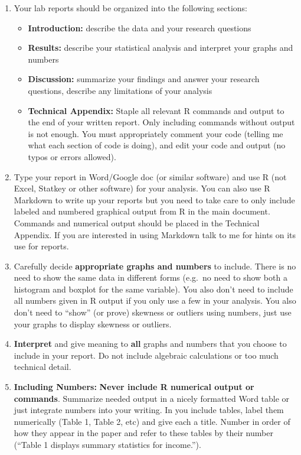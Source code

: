 \documentclass[
]{book}
\providecommand{\tightlist}{%
  \setlength{\itemsep}{0pt}\setlength{\parskip}{0pt}}
\begin{document}
\begin{enumerate}
\def\labelenumi{\arabic{enumi}.}
\item
  Your lab reports should be organized into the following sections:

  \begin{itemize}
  \tightlist
  \item
    \textbf{Introduction:} describe the data and your research questions
  \item
    \textbf{Results:} describe your statistical analysis and interpret your graphs and numbers
  \item
    \textbf{Discussion:} summarize your findings and answer your research questions, describe any limitations of
    your analysis
  \item
    \textbf{Technical Appendix:} Staple all relevant R commands and output to the end of your written report. Only including commands without output is not enough. You must appropriately comment your code (telling me what each section of code is doing), and edit your code and output (no typos or errors allowed).
  \end{itemize}
\item
  Type your report in Word/Google doc (or similar software) and use R (not Excel, Statkey or other software) for your analysis. You can also use R Markdown to write up your reports but you need to take care to only include labeled and numbered graphical output from R in the main document. Commands and numerical output should be placed in the Technical Appendix. If you are interested in using Markdown talk to me for hints on its use for reports.
\item
  Carefully decide \textbf{appropriate graphs and numbers} to include. There is no need to show the same data in different forms (e.g.~no need to show both a histogram and boxplot for the same variable). You also don't need to include all numbers given in R output if you only use a few in your analysis. You also don't need to ``show'' (or prove) skewness or outliers using numbers, just use your graphs to display skewness or outliers.
\item
  \textbf{Interpret} and give meaning to \textbf{all} graphs and numbers that you choose to include in your report. Do not include algebraic calculations or too much technical detail.
\item
  \textbf{Including Numbers:} \textbf{Never include R numerical output or commands}. Summarize needed output in a nicely formatted Word table or just integrate numbers into your writing. In you include tables, label them numerically (Table 1, Table 2, etc) and give each a title. Number in order of how they appear in the paper and refer to these tables by their number (``Table 1 displays summary statistics for income.'').

\end{enumerate}
\end{document}
